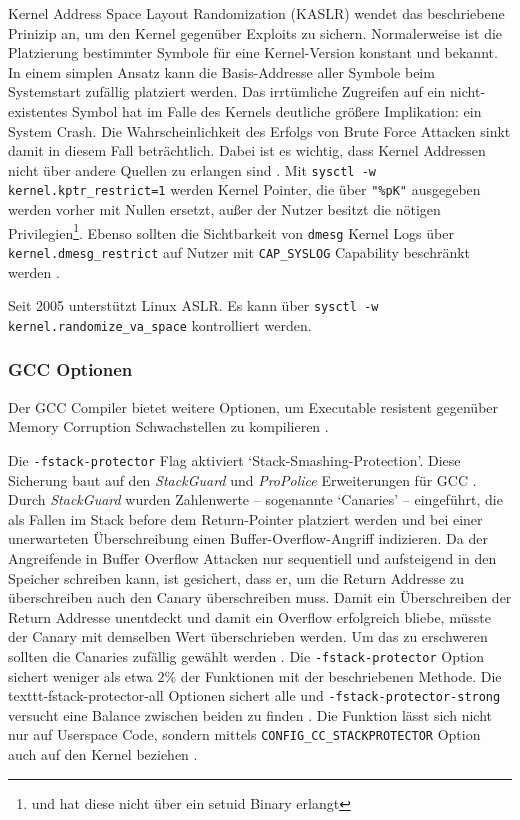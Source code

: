 Kernel Address Space Layout Randomization (KASLR) wendet das beschriebene Prinizip an, um den Kernel gegenüber Exploits zu sichern. Normalerweise ist die Platzierung bestimmter Symbole für eine Kernel-Version konstant und bekannt. In einem simplen Ansatz kann die Basis-Addresse aller Symbole beim Systemstart zufällig platziert werden. Das irrtümliche Zugreifen auf ein nicht-existentes Symbol hat im Falle des Kernels deutliche größere Implikation: ein System Crash. Die Wahrscheinlichkeit
des Erfolgs von Brute Force Attacken sinkt damit in diesem Fall beträchtlich. Dabei ist es wichtig, dass Kernel Addressen nicht über andere Quellen zu erlangen sind \cite{lwn-kaslr}. Mit \texttt{sysctl -w kernel.kptr\_restrict=1}  werden Kernel Pointer, die über \texttt{"\%pK"} ausgegeben werden vorher mit Nullen ersetzt, außer der Nutzer besitzt die nötigen Privilegien\footnote{und hat diese nicht über ein setuid Binary erlangt}. Ebenso sollten die Sichtbarkeit von \texttt{dmesg} Kernel Logs
über \texttt{kernel.dmesg\_restrict} auf Nutzer mit \texttt{CAP\_SYSLOG} Capability beschränkt werden \cite{sysctl-kernel}.

Seit 2005 unterstützt Linux ASLR. Es kann über \texttt{sysctl -w kernel.randomize\_va\_space} kontrolliert werden.

\subsubsection{GCC Optionen}

Der GCC Compiler bietet weitere Optionen, um Executable resistent gegenüber Memory Corruption Schwachstellen zu kompilieren \cite{deb-hardening}.

Die \texttt{-fstack-protector} Flag aktiviert `Stack-Smashing-Protection'. 
Diese Sicherung baut auf den \textit{StackGuard} und \textit{ProPolice} Erweiterungen für GCC \cite{stackguard, propolice}.
Durch \textit{StackGuard} wurden Zahlenwerte -- sogenannte `Canaries' -- eingeführt, die als Fallen im Stack before dem Return-Pointer platziert werden und bei einer unerwarteten Überschreibung einen Buffer-Overflow-Angriff indizieren. Da der Angreifende in Buffer Overflow Attacken nur sequentiell und aufsteigend in den Speicher schreiben kann, ist gesichert, dass er, um die Return Addresse zu überschreiben auch den Canary überschreiben muss. Damit ein Überschreiben der Return Addresse unentdeckt und damit ein Overflow erfolgreich bliebe, müsste der Canary mit demselben Wert überschrieben werden. Um das zu erschweren sollten die Canaries zufällig gewählt werden \cite{stackguard}. 
Die \texttt{-fstack-protector} Option sichert weniger als etwa 2\% der Funktionen mit der beschriebenen Methode. Die texttt{-fstack-protector-all} Optionen sichert alle und \texttt{-fstack-protector-strong} versucht eine Balance zwischen beiden zu finden \cite{stack-protector-strong}.
Die Funktion lässt sich nicht nur auf Userspace Code, sondern mittels \texttt{CONFIG\_CC\_STACKPROTECTOR} Option auch auf den Kernel beziehen \cite{ubuntu-security}.

